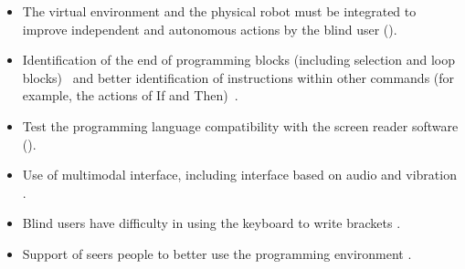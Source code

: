 \begin{itemize}
\item The virtual environment and the physical robot must be integrated to improve independent and autonomous actions by the blind user (\cite{Kakehashi2013,Motoyoshi:2015}).

\item Identification of the end of programming blocks (including selection and loop blocks)~\cite{Kakehashi:2015} and better identification of instructions within other commands (for example, the actions of If and Then)~\cite{ludi2014}.

\item Test the programming language compatibility with the screen reader software (\cite{ludi2011,Ludi:2008}).

\item Use of multimodal interface, including interface based on audio and vibration \cite{park2012}.

\item Blind users have difficulty in using the keyboard to write brackets \cite{ludi2014}.

\item Support of seers people to better use the programming environment \cite{Ludi:2008, ludi2011}.

\end{itemize}

